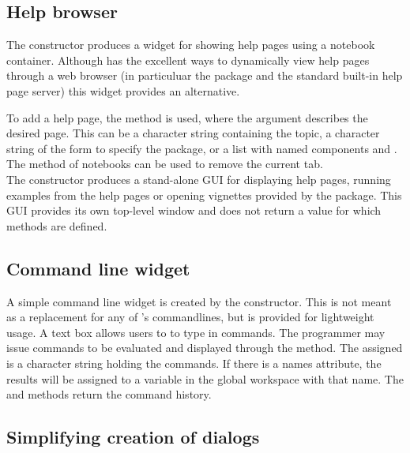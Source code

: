 \subsection{Help browser}
\label{sec:gWidgets-help-browser}

The  constructor produces a widget for showing help
pages using a notebook container. Although \R\/ has the excellent
ways to dynamically view help pages through a web browser (in
particuluar the  package and the standard built-in help
page server) this widget provides an alternative.

To add a help page, the  method is used,
where the  argument describes the desired page. This can
be a character string containing the topic, a character string of the
form  to specify the package, or a list with
named components  and .  The
 method of notebooks can be used to remove the
current tab.
\\

The  constructor produces a stand-alone
GUI for displaying help pages, running examples from the help pages or
opening vignettes provided by the package. This GUI provides its own
top-level window and does not return a value for which methods are defined.



\subsection{Command line widget}
\label{sec:gWidgets-command-line-widget}



A simple command line widget is created by the
 constructor. This is not meant as a
replacement for any of \R's commandlines, but is provided for
lightweight usage. A text box allows users to to type in \R\/
commands. The programmer may issue commands to be evaluated and
displayed through the  method. The
 assigned is a character string holding the commands. If
there is a names attribute, the results will be assigned to a variable
in the global workspace with that name. The  and \code{[}
methods return the command history.

\subsection{Simplifying creation of dialogs}
\label{sec:gWidgets-designing-forms}

